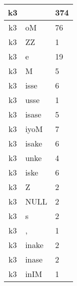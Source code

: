 \documentclass[a4 paper]{article}
\begin{document}
\begin{longtable}{cp{}p{}}
k3 &  & 374\\ \midrule k3 & oM & 76\\ \midrule k3 & ZZ & 1\\ \midrule k3 & e & 19\\ \midrule k3 & M & 5\\ \midrule k3 & isse & 6\\ \midrule k3 & usse & 1\\ \midrule k3 & isase & 5\\ \midrule k3 & iyoM & 7\\ \midrule k3 & isake & 6\\ \midrule k3 & unke & 4\\ \midrule k3 & iske & 6\\ \midrule k3 & Z & 2\\ \midrule k3 & NULL & 2\\ \midrule k3 & s & 2\\ \midrule k3 & , & 1\\ \midrule k3 & inake & 2\\ \midrule k3 & inase & 2\\ \midrule k3 & inIM & 1\\ \midrule 

\end{longtable}
\end{document}
